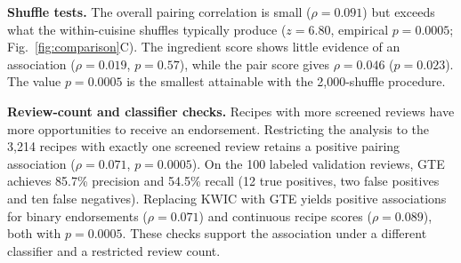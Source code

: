\textbf{Shuffle tests.} The overall pairing correlation is small ($\rho = 0.091$) but exceeds what the within-cuisine shuffles typically produce ($z = 6.80$, empirical $p = 0.0005$; Fig.~\ref{fig:comparison}C). The ingredient score shows little evidence of an association ($\rho = 0.019$, $p = 0.57$), while the pair score gives $\rho = 0.046$ ($p = 0.023$). The value $p = 0.0005$ is the smallest attainable with the 2,000-shuffle procedure.

\textbf{Review-count and classifier checks.} Recipes with more screened reviews have more opportunities to receive an endorsement. Restricting the analysis to the 3,214 recipes with exactly one screened review retains a positive pairing association ($\rho = 0.071$, $p = 0.0005$). On the 100 labeled validation reviews, GTE achieves 85.7\% precision and 54.5\% recall (12 true positives, two false positives and ten false negatives). Replacing KWIC with GTE yields positive associations for binary endorsements ($\rho = 0.071$) and continuous recipe scores ($\rho = 0.089$), both with $p = 0.0005$. These checks support the association under a different classifier and a restricted review count.
